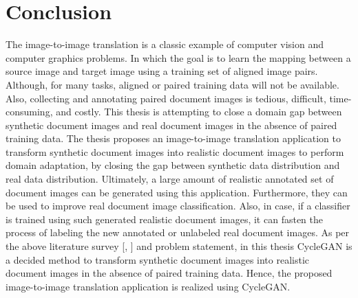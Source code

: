\section{Conclusion}\label{rwconclusion}

The image-to-image translation is a classic example of computer vision and computer graphics problems. In which the goal is to learn the mapping between a source image and target image using a training set of aligned image pairs. Although, for many tasks, aligned or paired training data will not be available. Also, collecting and annotating paired document images is tedious, difficult, time-consuming, and costly. This thesis is attempting to close a domain gap between synthetic document images and real document images in the absence of paired training data. The thesis proposes an image-to-image translation application to transform synthetic document images into realistic document images to perform domain adaptation, by closing the gap between synthetic data distribution and real data distribution. Ultimately, a large amount of realistic annotated set of document images can be generated using this application. Furthermore, they can be used to improve real document image classification. Also, in case, if a classifier is trained using such generated realistic document images, it can fasten the process of labeling the new annotated or unlabeled real document images. As per the above literature survey [\cite{zhu2020unpaired}, \cite{sharma2019learning}] and problem statement, in this thesis \ac{CycleGAN} is a decided method to transform synthetic document images into realistic document images in the absence of paired training data. Hence, the proposed image-to-image translation application is realized using \ac{CycleGAN}.







